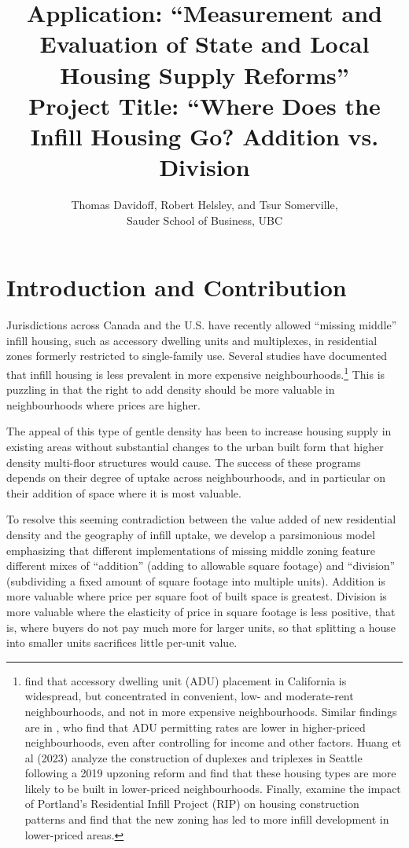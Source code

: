 \documentclass[12pt]{article}
\begin{document}
\title{Application: ``Measurement and Evaluation of State and Local Housing Supply Reforms''\\Project Title: ``Where Does the Infill Housing Go? Addition vs. Division}
\author{Thomas Davidoff, Robert Helsley, and Tsur Somerville, \\Sauder School of Business, UBC}
\maketitle

\section{Introduction and Contribution}

Jurisdictions across Canada and the U.S. have recently allowed
``missing middle'' infill housing, such as accessory dwelling units and
multiplexes, in residential zones formerly restricted to single-family
use. Several studies have documented that infill housing is less prevalent
in more expensive
neighbourhoods.\footnote{\textcite{MarantzElmendorfKim2023_ADUReforms} find
	that accessory dwelling unit (ADU) placement in California is
	widespread, but concentrated in convenient, low- and moderate-rent
	neighbourhoods, and not in more expensive neighbourhoods. Similar
	findings are in \textcite{BruecknerThomaz2024}, who find that ADU
	permitting rates are lower in higher-priced neighbourhoods, even after
	controlling for income and other factors. Huang et al (2023) analyze
	the construction of duplexes and triplexes in Seattle following a 2019
	upzoning reform and find that these housing types are more likely to be
	built in lower-priced neighbourhoods. Finally,
	\textcite{DongHansz_2019} examine the impact of Portland's Residential
	Infill Project (RIP) on housing construction patterns and find that the
new zoning has led to more infill development in lower-priced areas.} This is
puzzling in that the right to add density should be more valuable in
neighbourhoods where prices are higher.

The appeal of this type of gentle density has been to increase housing supply in existing areas without substantial changes to the urban built form that higher density multi-floor structures would cause. The success of these programs depends on their degree of uptake across neighbourhoods, and in particular on their addition of space where it is most valuable.


To resolve this seeming contradiction between the value added of new
residential density and the geography of infill uptake, we develop a
parsimonious model emphasizing that different implementations of missing middle
zoning feature different mixes of ``addition'' (adding to allowable square
footage) and ``division'' (subdividing a fixed amount of square footage into
multiple units). Addition is more valuable where price per square foot of built
space is greatest. Division is more valuable where the elasticity of price in
square footage is less positive, that is, where buyers do not pay much more for
larger units, so that splitting a house into smaller units sacrifices little
per-unit value.  
\end{document}
